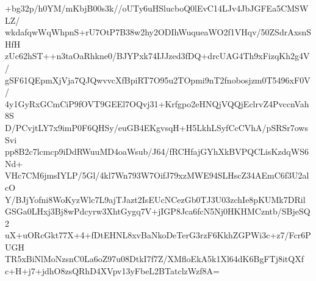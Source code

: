 +bg32p/h0YM/mKbjB00s3k//oUTy6uHSlucboQ0lEvC14LJv4JbJGFEa5CMSWLZ/
wkdafqwWqWhpnS+rU7OtP7B38w2hy2ODIhWuqueaWO2f1VHqv/50ZSdrAxsnSHfH
zUc62hST++n3taOaRhkne0/BJYPxk74IJJzed3fDQ+drcUAG4Th9xFizqKh2g4V/
gSF61QEpmXjVja7QJQwvvcXfBpiRT7O95u2TOpmi9nT2fnobosjzm0T5496xF0V/
4y1GyRxGCmCiP9fOVT9GEEl7OQvj31+Krfgpo2eHNQjVQQjEclrvZ4PvccnVah8S
D/PCvjtLY7x9imP0F6QHSy/euGB4EKgvsqH+H5LkhLSyfCcCVhA/pSRSr7owsSvi
pp8B2c7lcmcp9iDdRWuuMD4oaWsub/J64/fRCHfajGYhXkBVPQCLisKzdqWS6Nd+
VHc7CM6jmsIYLP/5Gl/4kl7Wn793W7OifJ79xzMWE94SLHscZ34AEmC6f3U2alcO
Y/BJjYofni8WoKyzWlc7L9ajTJazt2IsEUcNCezGb0TJ3U03zchIe8pKUMk7DRil
GSGa0LHxj3Bj8wPdcyrw3XhtGygq7V+jIGP8Jca6fcN5Nj0HKHMCzntb/SBjeSQ2
uX+uORcGkt77X+4+fDtEHNL8xvBaNkoDeTerG3rzF6KkhZGPWi3c+z7/Fcr6PUGH
TR5xBiNlMoNzsnC0La6oZ97u08DtkI7f7Z/XMfloEkA5k1Xl64dK6BgFTj8itQXf
c+H+j7+jdhO8zsQRhD4XVpv13yFbeL2BTatclzWzf8A=
